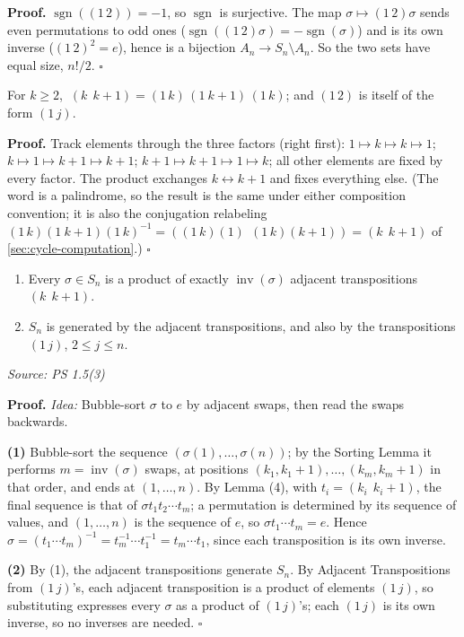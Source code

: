 \documentclass[11pt]{report}
\newcommand{\sgn}{\operatorname{sgn}}
\renewenvironment{proof}[1][Proof]{\noindent\textbf{#1.} }{\hfill$\square$\par\vspace{5pt}}
\newcommand{\srcline}[1]{\par\hfill{\footnotesize\textit{Source: #1}}}
\begin{document}
\begin{proof}
$\sgn((1\,2)) = -1$, so $\sgn$ is surjective. The map $\sigma \mapsto (1\,2)\sigma$ sends even permutations to odd ones ($\sgn((1\,2)\sigma) = -\sgn(\sigma)$) and is its own inverse ($(1\,2)^2 = e$), hence is a bijection $A_n \to S_n \setminus A_n$. So the two sets have equal size, $n!/2$.
\end{proof}

\begin{lembox}\label{lem:adjacent-transpositions-1-j-s}
For $k \geq 2$, $\ (k\ \ k{+}1) = (1\,k)\,(1\ k{+}1)\,(1\,k)$; and $(1\,2)$ is itself of the form $(1\,j)$.
\end{lembox}

\begin{proof}
Track elements through the three factors (right first): $1 \mapsto k \mapsto k \mapsto 1$; $k \mapsto 1 \mapsto k{+}1 \mapsto k{+}1$; $k{+}1 \mapsto k{+}1 \mapsto 1 \mapsto k$; all other elements are fixed by every factor. The product exchanges $k \leftrightarrow k{+}1$ and fixes everything else. (The word is a palindrome, so the result is the same under either composition convention; it is also the conjugation relabeling $(1\,k)(1\ k{+}1)(1\,k)^{-1} = ((1\,k)(1)\ \ (1\,k)(k{+}1)) = (k\ \ k{+}1)$ of \ref{sec:cycle-computation}.)
\end{proof}

\begin{thmbox}[{Generators of $S_n$}]\label{thm:generators-sn}
\begin{enumerate}
    \item Every $\sigma \in S_n$ is a product of exactly $\operatorname{inv}(\sigma)$ adjacent transpositions $(k\ \ k{+}1)$.
    \item $S_n$ is generated by the adjacent transpositions, and also by the transpositions $(1\,j)$, $2 \leq j \leq n$.
\end{enumerate}
\srcline{PS 1.5(3)}
\end{thmbox}

\begin{proof}
\textit{Idea:} Bubble-sort $\sigma$ to $e$ by adjacent swaps, then read the swaps backwards.\par
\textbf{(1)} Bubble-sort the sequence $(\sigma(1), \ldots, \sigma(n))$; by the Sorting Lemma it performs $m = \operatorname{inv}(\sigma)$ swaps, at positions $(k_1, k_1{+}1), \ldots, (k_m, k_m{+}1)$ in that order, and ends at $(1, \ldots, n)$. By Lemma (4), with $t_i = (k_i\ \ k_i{+}1)$, the final sequence is that of $\sigma t_1 t_2 \cdots t_m$; a permutation is determined by its sequence of values, and $(1, \ldots, n)$ is the sequence of $e$, so $\sigma t_1 \cdots t_m = e$. Hence $\sigma = (t_1 \cdots t_m)^{-1} = t_m^{-1} \cdots t_1^{-1} = t_m \cdots t_1$, since each transposition is its own inverse.

\textbf{(2)} By (1), the adjacent transpositions generate $S_n$. By Adjacent Transpositions from $(1\,j)$'s, each adjacent transposition is a product of elements $(1\,j)$, so substituting expresses every $\sigma$ as a product of $(1\,j)$'s; each $(1\,j)$ is its own inverse, so no inverses are needed.
\end{proof}
\end{document}
